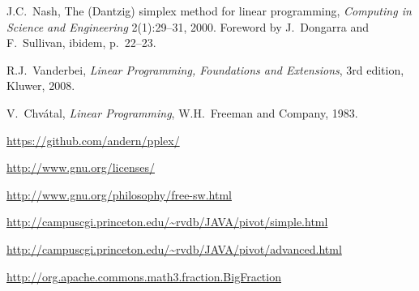 \documentclass[ukenglish,a4]{article}
\begin{document}

\begin{thebibliography}{99}
 J.C.~Nash, 
The (Dantzig) simplex method for linear programming,
\emph{Computing in Science and Engineering} 2(1):29--31, 2000.
Foreword by J.~Dongarra and F.~Sullivan, ibidem, p.~22--23.

 R.J.~Vanderbei, 
\emph{Linear Programming, Foundations and Extensions},
3rd edition, Kluwer, 2008.

 V.~Chv\'atal,
\emph{Linear Programming},
W.H.~Freeman and Company, 1983.

\url{https://github.com/andern/pplex/}

\url{http://www.gnu.org/licenses/}

\url{http://www.gnu.org/philosophy/free-sw.html}

\url{http://campuscgi.princeton.edu/~rvdb/JAVA/pivot/simple.html}

\url{http://campuscgi.princeton.edu/~rvdb/JAVA/pivot/advanced.html}

\url{http://org.apache.commons.math3.fraction.BigFraction}

\end{thebibliography}
\end{document}
